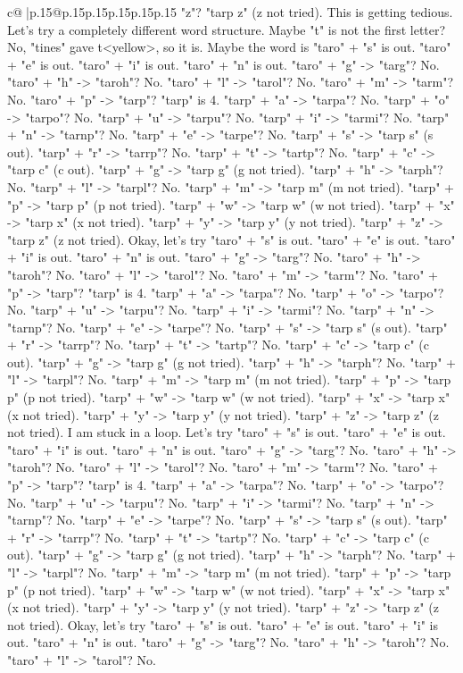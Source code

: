 \documentclass{article}
\begin{document}
{\begin{supertabular}{c@{$\;$}|p{.15\linewidth}@{}p{.15\linewidth}p{.15\linewidth}p{.15\linewidth}p{.15\linewidth}p{.15\linewidth}}
{{{"z"? "tarp z" (z not tried). This is getting tedious. Let's try a completely different word structure. Maybe "t" is not the first letter? No, "tines" gave t<yellow>, so it is. Maybe the word is "taro" + "s" is out. "taro" + "e" is out. "taro" + "i" is out. "taro" + "n" is out. "taro" + "g" {-}> "targ"? No. "taro" + "h" {-}> "taroh"? No. "taro" + "l" {-}> "tarol"? No. "taro" + "m" {-}> "tarm"? No. "taro" + "p" {-}> "tarp"? "tarp" is 4. "tarp" + "a" {-}> "tarpa"? No. "tarp" + "o" {-}> "tarpo"? No. "tarp" + "u" {-}> "tarpu"? No. "tarp" + "i" {-}> "tarmi"? No. "tarp" + "n" {-}> "tarnp"? No. "tarp" + "e" {-}> "tarpe"? No. "tarp" + "s" {-}> "tarp s" (s out). "tarp" + "r" {-}> "tarrp"? No. "tarp" + "t" {-}> "tartp"? No. "tarp" + "c" {-}> "tarp c" (c out). "tarp" + "g" {-}> "tarp g" (g not tried). "tarp" + "h" {-}> "tarph"? No. "tarp" + "l" {-}> "tarpl"? No. "tarp" + "m" {-}> "tarp m" (m not tried). "tarp" + "p" {-}> "tarp p" (p not tried). "tarp" + "w" {-}> "tarp w" (w not tried). "tarp" + "x" {-}> "tarp x" (x not tried). "tarp" + "y" {-}> "tarp y" (y not tried). "tarp" + "z" {-}> "tarp z" (z not tried). Okay, let's try "taro" + "s" is out. "taro" + "e" is out. "taro" + "i" is out. "taro" + "n" is out. "taro" + "g" {-}> "targ"? No. "taro" + "h" {-}> "taroh"? No. "taro" + "l" {-}> "tarol"? No. "taro" + "m" {-}> "tarm"? No. "taro" + "p" {-}> "tarp"? "tarp" is 4. "tarp" + "a" {-}> "tarpa"? No. "tarp" + "o" {-}> "tarpo"? No. "tarp" + "u" {-}> "tarpu"? No. "tarp" + "i" {-}> "tarmi"? No. "tarp" + "n" {-}> "tarnp"? No. "tarp" + "e" {-}> "tarpe"? No. "tarp" + "s" {-}> "tarp s" (s out). "tarp" + "r" {-}> "tarrp"? No. "tarp" + "t" {-}> "tartp"? No. "tarp" + "c" {-}> "tarp c" (c out). "tarp" + "g" {-}> "tarp g" (g not tried). "tarp" + "h" {-}> "tarph"? No. "tarp" + "l" {-}> "tarpl"? No. "tarp" + "m" {-}> "tarp m" (m not tried). "tarp" + "p" {-}> "tarp p" (p not tried). "tarp" + "w" {-}> "tarp w" (w not tried). "tarp" + "x" {-}> "tarp x" (x not tried). "tarp" + "y" {-}> "tarp y" (y not tried). "tarp" + "z" {-}> "tarp z" (z not tried). I am stuck in a loop. Let's try "taro" + "s" is out. "taro" + "e" is out. "taro" + "i" is out. "taro" + "n" is out. "taro" + "g" {-}> "targ"? No. "taro" + "h" {-}> "taroh"? No. "taro" + "l" {-}> "tarol"? No. "taro" + "m" {-}> "tarm"? No. "taro" + "p" {-}> "tarp"? "tarp" is 4. "tarp" + "a" {-}> "tarpa"? No. "tarp" + "o" {-}> "tarpo"? No. "tarp" + "u" {-}> "tarpu"? No. "tarp" + "i" {-}> "tarmi"? No. "tarp" + "n" {-}> "tarnp"? No. "tarp" + "e" {-}> "tarpe"? No. "tarp" + "s" {-}> "tarp s" (s out). "tarp" + "r" {-}> "tarrp"? No. "tarp" + "t" {-}> "tartp"? No. "tarp" + "c" {-}> "tarp c" (c out). "tarp" + "g" {-}> "tarp g" (g not tried). "tarp" + "h" {-}> "tarph"? No. "tarp" + "l" {-}> "tarpl"? No. "tarp" + "m" {-}> "tarp m" (m not tried). "tarp" + "p" {-}> "tarp p" (p not tried). "tarp" + "w" {-}> "tarp w" (w not tried). "tarp" + "x" {-}> "tarp x" (x not tried). "tarp" + "y" {-}> "tarp y" (y not tried). "tarp" + "z" {-}> "tarp z" (z not tried). Okay, let's try "taro" + "s" is out. "taro" + "e" is out. "taro" + "i" is out. "taro" + "n" is out. "taro" + "g" {-}> "targ"? No. "taro" + "h" {-}> "taroh"? No. "taro" + "l" {-}> "tarol"? No. }}}
\end{supertabular}}
\end{document}
